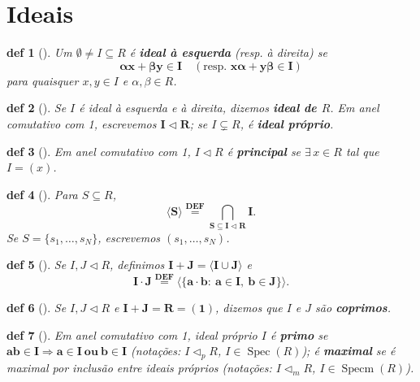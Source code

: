 \documentclass[11pt]{article}
\DeclareMathOperator{\Spec}{Spec} %
\DeclareMathOperator{\Specm}{Specm} %
\newcommand{\defname}[1]{\colorbox{yellow!30}{\strut \textbf{#1}}}
\newtheorem*{definition}{def}
\theoremstyle{definition}
\begin{document}
\section{Ideais}
\begin{multicols}{3}


\begin{definition}[\defname{Ideal à Esquerda / à Direita}]
Um \(\emptyset\neq I\subseteq R\) é \textbf{ideal à esquerda} (resp. à direita) se
\[
\mathbf{\alpha x+\beta y\in I}\quad (\text{resp. } \mathbf{x\alpha+y\beta\in I})
\]
para quaisquer \(x,y\in I\) e \(\alpha,\beta\in R\).
\end{definition}

\begin{definition}[\defname{Ideal}]
Se \(I\) é ideal à esquerda e à direita, dizemos \textbf{ideal de \(R\)}. Em anel comutativo com 1, escrevemos \(\mathbf{I\triangleleft R}\); se \(I\subsetneq R\), é \textbf{ideal próprio}.
\end{definition}

\begin{definition}[\defname{Ideal Principal}]
Em anel comutativo com 1, \(I\triangleleft R\) é \textbf{principal} se \(\exists\,x\in R\) tal que \(I=(x)\).
\end{definition}

\begin{definition}[\defname{Ideal Gerado por \(S\)}]
Para \(S\subseteq R\),
\[
\mathbf{\langle S\rangle\stackrel{\text{DEF}}{=}\bigcap_{S\subseteq I\triangleleft R} I}.
\]
Se \(S=\{s_1,\dots,s_N\}\), escrevemos \((s_1,\dots,s_N)\).
\end{definition}

\begin{definition}[\defname{Soma e Produto de Ideais}]
Se \(I,J\triangleleft R\), definimos \(\mathbf{I+J=\langle I\cup J\rangle}\) e
\[
\mathbf{I\cdot J\stackrel{\text{DEF}}{=}\langle\{a\cdot b:\ a\in I,\ b\in J\}\rangle}.
\]
\end{definition}

\begin{definition}[\defname{Ideais Coprimos}]
Se \(I,J\triangleleft R\) e \(\mathbf{I+J=R=(1)}\), dizemos que \(I\) e \(J\) são \textbf{coprimos}.
\end{definition}

\begin{definition}[\defname{Ideal Primo e Maximal}]
Em anel comutativo com 1, ideal próprio \(I\) é \textbf{primo} se
\(\mathbf{ab\in I\Rightarrow a\in I\ \text{ou}\ b\in I}\) (notações: \(I\triangleleft_p R\), \(I\in\Spec(R)\));
é \textbf{maximal} se é maximal por inclusão entre ideais próprios (notações: \(I\triangleleft_m R\), \(I\in\Specm(R)\)).
\end{definition}




\end{multicols}
\end{document}
